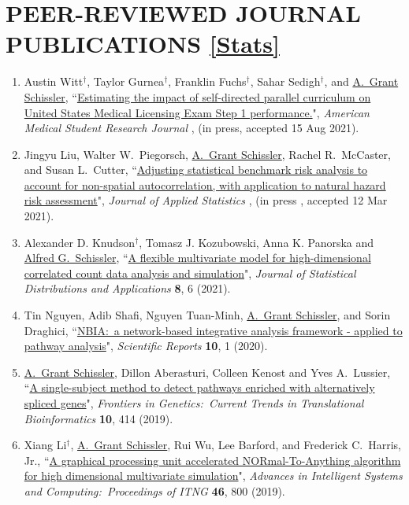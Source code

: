 \documentclass[paper=a4,fontsize=11pt]{scrartcl} %
\newcommand{\NewPart}[2]{\section*{\uppercase{#1} #2 }}
\newcommand{\PaperEntry}[7]{
		\noindent #1, ``\href{#7}{#2}", \textit{#3} \textbf{#4}, #5 (#6).}
\begin{document}
\NewPart{Peer-Reviewed Journal Publications}{\href{https://scholar.google.com/citations?user=1H-SHoMAAAAJ&hl=en}{[Stats]}}
\vspace{-7pt}
\begin{enumerate}

  \item \PaperEntry{Austin Witt$^{\dagger}$, Taylor Gurnea$^{\dagger}$, Franklin Fuchs$^{\dagger}$, Sahar Sedigh$^{\dagger}$, and \underline{A.~Grant Schissler}}{Estimating the impact of self-directed parallel curriculum on United States Medical Licensing Exam Step 1 performance.}{American Medical Student Research Journal}{}{}{in press, accepted 15 Aug 2021}{}
  
\item \PaperEntry{Jingyu Liu, Walter W.~Piegorsch, \underline{A.~Grant Schissler}, Rachel R.~McCaster, and Susan L.~Cutter}{Adjusting statistical benchmark risk analysis to account for non-spatial autocorrelation, with application to natural hazard risk assessment}{Journal of Applied Statistics}{}{}{in press , accepted 12 Mar 2021}{}

  \item \PaperEntry{Alexander D. Knudson$^{\dagger}$, Tomasz J. Kozubowski, Anna K. Panorska and \underline{Alfred G.~Schissler}}{A flexible multivariate model for high-dimensional correlated count data analysis and simulation}{Journal of Statistical Distributions and Applications}{8}{6}{2021}{https://rdcu.be/cgTkg}

  \item \PaperEntry{Tin Nguyen, Adib Shafi, Nguyen Tuan-Minh, \underline{A.~Grant Schissler}, and Sorin Draghici}{NBIA:~a network-based integrative analysis framework - applied to pathway analysis}{Scientific Reports}{10}{1}{2020}{https://www.nature.com/articles/s41598-020-60981-9}
  
\item \PaperEntry{\underline{A.~Grant Schissler}, Dillon Aberasturi, Colleen Kenost and Yves A.~Lussier}{A single-subject method to detect pathways enriched with alternatively spliced genes}{Frontiers in Genetics:~Current Trends in Translational Bioinformatics}{10}{414}{2019}{https://www.frontiersin.org/articles/10.3389/fgene.2019.00414/full}
  
    \item \PaperEntry{Xiang Li$^{\dagger}$, \underline{A.~Grant Schissler}, Rui Wu, Lee Barford, and Frederick C.~Harris, Jr.}{A graphical processing unit accelerated NORmal-To-Anything algorithm for high dimensional multivariate simulation}{Advances in Intelligent Systems and Computing:~Proceedings of ITNG}{46}{800}{2019}{https://link.springer.com/chapter/10.1007/978-3-030-14070-0_46}
  

\end{enumerate}
\end{document}

